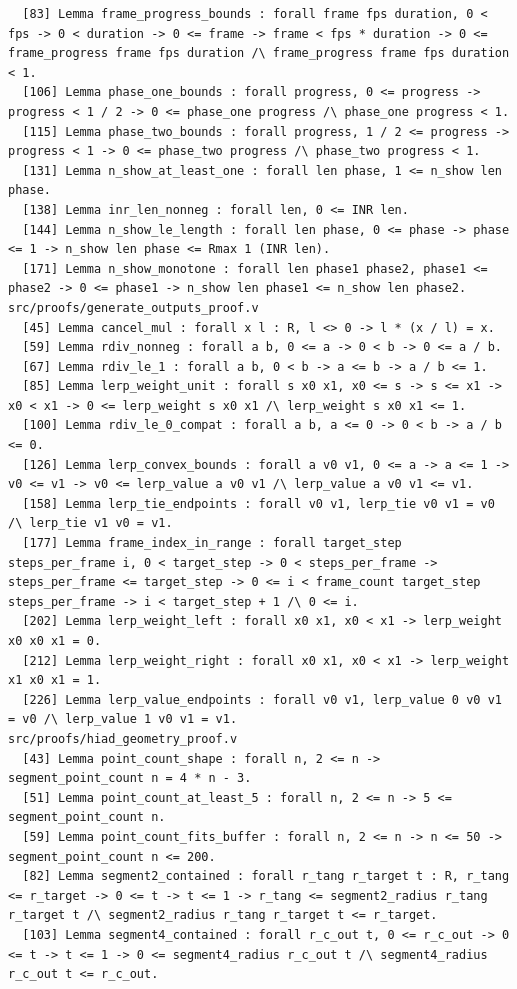 \documentclass[11pt]{article}
\theoremstyle{definition}
\begin{document}
\begin{verbatim}
  [83] Lemma frame_progress_bounds : forall frame fps duration, 0 < fps -> 0 < duration -> 0 <= frame -> frame < fps * duration -> 0 <= frame_progress frame fps duration /\ frame_progress frame fps duration < 1.
  [106] Lemma phase_one_bounds : forall progress, 0 <= progress -> progress < 1 / 2 -> 0 <= phase_one progress /\ phase_one progress < 1.
  [115] Lemma phase_two_bounds : forall progress, 1 / 2 <= progress -> progress < 1 -> 0 <= phase_two progress /\ phase_two progress < 1.
  [131] Lemma n_show_at_least_one : forall len phase, 1 <= n_show len phase.
  [138] Lemma inr_len_nonneg : forall len, 0 <= INR len.
  [144] Lemma n_show_le_length : forall len phase, 0 <= phase -> phase <= 1 -> n_show len phase <= Rmax 1 (INR len).
  [171] Lemma n_show_monotone : forall len phase1 phase2, phase1 <= phase2 -> 0 <= phase1 -> n_show len phase1 <= n_show len phase2.
src/proofs/generate_outputs_proof.v
  [45] Lemma cancel_mul : forall x l : R, l <> 0 -> l * (x / l) = x.
  [59] Lemma rdiv_nonneg : forall a b, 0 <= a -> 0 < b -> 0 <= a / b.
  [67] Lemma rdiv_le_1 : forall a b, 0 < b -> a <= b -> a / b <= 1.
  [85] Lemma lerp_weight_unit : forall s x0 x1, x0 <= s -> s <= x1 -> x0 < x1 -> 0 <= lerp_weight s x0 x1 /\ lerp_weight s x0 x1 <= 1.
  [100] Lemma rdiv_le_0_compat : forall a b, a <= 0 -> 0 < b -> a / b <= 0.
  [126] Lemma lerp_convex_bounds : forall a v0 v1, 0 <= a -> a <= 1 -> v0 <= v1 -> v0 <= lerp_value a v0 v1 /\ lerp_value a v0 v1 <= v1.
  [158] Lemma lerp_tie_endpoints : forall v0 v1, lerp_tie v0 v1 = v0 /\ lerp_tie v1 v0 = v1.
  [177] Lemma frame_index_in_range : forall target_step steps_per_frame i, 0 < target_step -> 0 < steps_per_frame -> steps_per_frame <= target_step -> 0 <= i < frame_count target_step steps_per_frame -> i < target_step + 1 /\ 0 <= i.
  [202] Lemma lerp_weight_left : forall x0 x1, x0 < x1 -> lerp_weight x0 x0 x1 = 0.
  [212] Lemma lerp_weight_right : forall x0 x1, x0 < x1 -> lerp_weight x1 x0 x1 = 1.
  [226] Lemma lerp_value_endpoints : forall v0 v1, lerp_value 0 v0 v1 = v0 /\ lerp_value 1 v0 v1 = v1.
src/proofs/hiad_geometry_proof.v
  [43] Lemma point_count_shape : forall n, 2 <= n -> segment_point_count n = 4 * n - 3.
  [51] Lemma point_count_at_least_5 : forall n, 2 <= n -> 5 <= segment_point_count n.
  [59] Lemma point_count_fits_buffer : forall n, 2 <= n -> n <= 50 -> segment_point_count n <= 200.
  [82] Lemma segment2_contained : forall r_tang r_target t : R, r_tang <= r_target -> 0 <= t -> t <= 1 -> r_tang <= segment2_radius r_tang r_target t /\ segment2_radius r_tang r_target t <= r_target.
  [103] Lemma segment4_contained : forall r_c_out t, 0 <= r_c_out -> 0 <= t -> t <= 1 -> 0 <= segment4_radius r_c_out t /\ segment4_radius r_c_out t <= r_c_out.

\end{verbatim}
\end{document}
